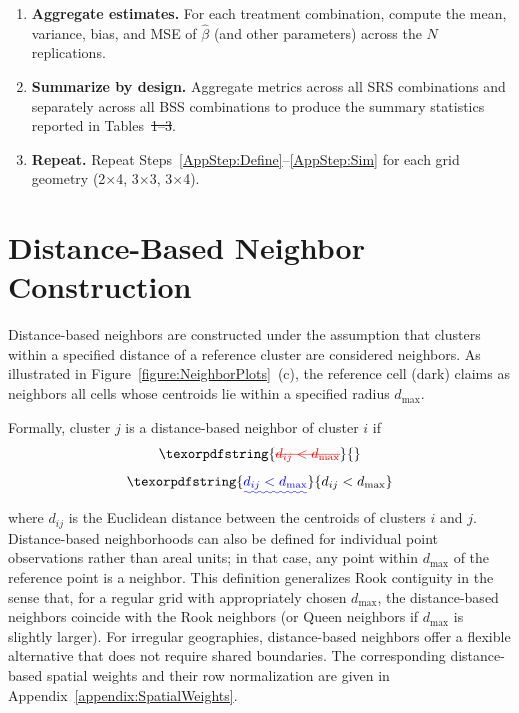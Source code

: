 \documentclass{article}[11pt]
\makeatletter
\providecommand{\DIFaddtex}[1]{{\protect\color{blue}\uwave{#1}}} %
\providecommand{\DIFdeltex}[1]{{\protect\color{red}\sout{#1}}} %
\providecommand{\DIFaddbegin}{} %
\providecommand{\DIFaddend}{} %
\providecommand{\DIFdelbegin}{} %
\providecommand{\DIFdelend}{} %
\providecommand{\DIFadd}[1]{\texorpdfstring{\DIFaddtex{#1}}{#1}} %
\providecommand{\DIFdel}[1]{\texorpdfstring{\DIFdeltex{#1}}{}} %
\providecommand{\DIFscaledelfig}{0.5}
\newlength{\DIFdelgraphicswidth} %
\newlength{\DIFdelgraphicsheight} %
\providecommand{\DIFaddincludegraphics}[2][]{{\color{blue}\fbox{\DIFOincludegraphics[#1]{#2}}}} %
\providecommand{\DIFdelincludegraphics}[2][]{%
\sbox{\DIFdelgraphicsbox}{\DIFOincludegraphics[#1]{#2}}%
\settoboxwidth{\DIFdelgraphicswidth}{\DIFdelgraphicsbox} %
\settoboxtotalheight{\DIFdelgraphicsheight}{\DIFdelgraphicsbox} %
\scalebox{\DIFscaledelfig}{%
\parbox[b]{\DIFdelgraphicswidth}{\usebox{\DIFdelgraphicsbox}\\[-\baselineskip] \rule{\DIFdelgraphicswidth}{0em}}\llap{\resizebox{\DIFdelgraphicswidth}{\DIFdelgraphicsheight}{%
\setlength{\unitlength}{\DIFdelgraphicswidth}%
\begin{picture}(1,1)%
\thicklines\linethickness{2pt} %
{\color[rgb]{1,0,0}\put(0,0){\framebox(1,1){}}}%
{\color[rgb]{1,0,0}\put(0,0){\line( 1,1){1}}}%
{\color[rgb]{1,0,0}\put(0,1){\line(1,-1){1}}}%
\end{picture}%
}\hspace*{3pt}}} %
} %
\DeclareRobustCommand{\DIFaddbegin}{\DIFOaddbegin \let\includegraphics\DIFaddincludegraphics} %
\DeclareRobustCommand{\DIFaddend}{\DIFOaddend \let\includegraphics\DIFOincludegraphics} %
\DeclareRobustCommand{\DIFdelbegin}{\DIFOdelbegin \let\includegraphics\DIFdelincludegraphics} %
\DeclareRobustCommand{\DIFdelend}{\DIFOaddend \let\includegraphics\DIFOincludegraphics} %
\let\sout@orig\sout %
\renewcommand{\sout}[1]{\ifmmode\text{\sout@orig{\ensuremath{#1}}}\else\sout@orig{#1}\fi} %
\makeatother
\begin{document}
\begin{enumerate}
    \item \textbf{Aggregate estimates.} For each treatment combination, compute the mean, variance, bias, and MSE of $\hat\beta$ (and other parameters) across the $N$ replications.

    \item \textbf{Summarize by design.} Aggregate metrics across all SRS combinations and separately across all BSS combinations to produce the summary statistics reported in Tables~\DIFdelbegin \DIFdel{1--3}\DIFdelend \DIFaddbegin \DIFadd{\ref{table:InterventionEstimates2x4}--\ref{table:InterventionEstimates3x4}}\DIFaddend .

    \item\label{AppStep:Repeat} \textbf{Repeat.} Repeat Steps~\ref{AppStep:Define}--\ref{AppStep:Sim} for each grid geometry (2$\times$4, 3$\times$3, 3$\times$4).
\end{enumerate}

\section{Distance-Based Neighbor Construction}\label{appendix:DistanceBased}

Distance-based neighbors\cite{fotheringham_sage_2009} are constructed under the assumption that clusters within a specified distance of a reference cluster are considered neighbors. As illustrated in Figure~\ref{figure:NeighborPlots}~(c), the reference cell (dark) claims as neighbors all cells whose centroids lie within a specified radius $d_{\max}$.

Formally, cluster $j$ is a distance-based neighbor of cluster $i$ if
\DIFdelbegin \begin{displaymath}
    \DIFdel{d_{ij} < d_{\max}
}\end{displaymath}%
\DIFdelend \DIFaddbegin \begin{equation*}
    \DIFadd{d_{ij} < d_{\max}
}\end{equation*}\DIFaddend 
where $d_{ij}$ is the Euclidean distance between the centroids of clusters $i$ and $j$. Distance-based neighborhoods can also be defined for individual point observations rather than areal units; in that case, any point within $d_{\max}$ of the reference point is a neighbor. This definition generalizes Rook contiguity in the sense that, for a regular grid with appropriately chosen $d_{\max}$, the distance-based neighbors coincide with the Rook neighbors (or Queen neighbors if $d_{\max}$ is slightly larger). For irregular geographies, distance-based neighbors offer a flexible alternative that does not require shared boundaries. The corresponding distance-based spatial weights and their row normalization are given in Appendix~\ref{appendix:SpatialWeights}.
\end{document}

